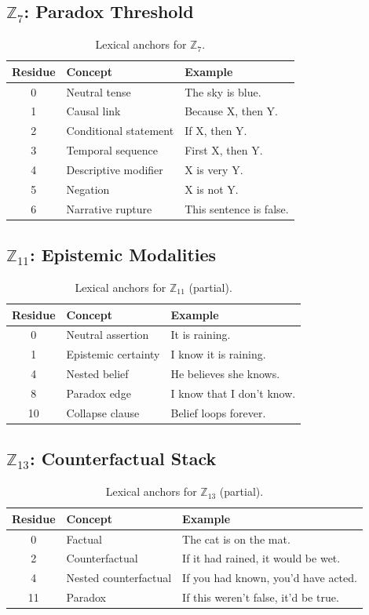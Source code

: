 \documentclass[11pt]{article}
\begin{document}
\subsection{$\mathbb{Z}_7$: Paradox Threshold}
\begin{table}[h]
\centering
\begin{tabular}{cll}
\toprule
Residue & Concept & Example \\
\midrule
0 & Neutral tense & The sky is blue. \\
1 & Causal link & Because X, then Y. \\
2 & Conditional statement & If X, then Y. \\
3 & Temporal sequence & First X, then Y. \\
4 & Descriptive modifier & X is very Y. \\
5 & Negation & X is not Y. \\
6 & Narrative rupture & This sentence is false. \\
\bottomrule
\end{tabular}
\caption{Lexical anchors for $\mathbb{Z}_7$.}
\end{table}

\subsection{$\mathbb{Z}_{11}$: Epistemic Modalities}
\begin{table}[h]
\centering
\begin{tabular}{cll}
\toprule
Residue & Concept & Example \\
\midrule
0 & Neutral assertion & It is raining. \\
1 & Epistemic certainty & I know it is raining. \\
4 & Nested belief & He believes she knows. \\
8 & Paradox edge & I know that I don’t know. \\
10 & Collapse clause & Belief loops forever. \\
\bottomrule
\end{tabular}
\caption{Lexical anchors for $\mathbb{Z}_{11}$ (partial).}
\end{table}

\subsection{$\mathbb{Z}_{13}$: Counterfactual Stack}
\begin{table}[h]
\centering
\begin{tabular}{cll}
\toprule
Residue & Concept & Example \\
\midrule
0 & Factual & The cat is on the mat. \\
2 & Counterfactual & If it had rained, it would be wet. \\
4 & Nested counterfactual & If you had known, you’d have acted. \\
11 & Paradox & If this weren’t false, it’d be true. \\
\bottomrule
\end{tabular}
\caption{Lexical anchors for $\mathbb{Z}_{13}$ (partial).}
\end{table}
\end{document}
